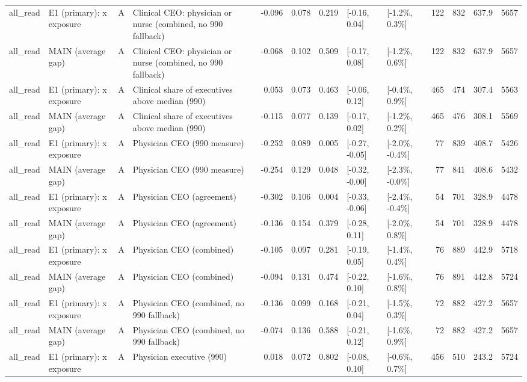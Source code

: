 \begin{tabular}{llllrrrllrrrr}
all\_read & E1 (primary): x exposure & A & Clinical CEO: physician or nurse (combined, no 990 fallback) & -0.096 & 0.078 & 0.219 & {}[-0.16, 0.04] & {}[-1.2\%, 0.3\%] & 122 & 832 & 637.9 & 5657\\
all\_read & MAIN (average gap) & A & Clinical CEO: physician or nurse (combined, no 990 fallback) & -0.068 & 0.102 & 0.509 & {}[-0.17, 0.08] & {}[-1.2\%, 0.6\%] & 122 & 832 & 637.9 & 5657\\
all\_read & E1 (primary): x exposure & A & Clinical share of executives above median (990) & 0.053 & 0.073 & 0.463 & {}[-0.06, 0.12] & {}[-0.4\%, 0.9\%] & 465 & 474 & 307.4 & 5563\\
all\_read & MAIN (average gap) & A & Clinical share of executives above median (990) & -0.115 & 0.077 & 0.139 & {}[-0.17, 0.02] & {}[-1.2\%, 0.2\%] & 465 & 476 & 308.1 & 5569\\
\addlinespace
all\_read & E1 (primary): x exposure & A & Physician CEO (990 measure) & -0.252 & 0.089 & 0.005 & {}[-0.27, -0.05] & {}[-2.0\%, -0.4\%] & 77 & 839 & 408.7 & 5426\\
all\_read & MAIN (average gap) & A & Physician CEO (990 measure) & -0.254 & 0.129 & 0.048 & {}[-0.32, -0.00] & {}[-2.3\%, -0.0\%] & 77 & 841 & 408.6 & 5432\\
all\_read & E1 (primary): x exposure & A & Physician CEO (agreement) & -0.302 & 0.106 & 0.004 & {}[-0.33, -0.06] & {}[-2.4\%, -0.4\%] & 54 & 701 & 328.9 & 4478\\
all\_read & MAIN (average gap) & A & Physician CEO (agreement) & -0.136 & 0.154 & 0.379 & {}[-0.28, 0.11] & {}[-2.0\%, 0.8\%] & 54 & 701 & 328.9 & 4478\\
all\_read & E1 (primary): x exposure & A & Physician CEO (combined) & -0.105 & 0.097 & 0.281 & {}[-0.19, 0.05] & {}[-1.4\%, 0.4\%] & 76 & 889 & 442.9 & 5718\\
\addlinespace
all\_read & MAIN (average gap) & A & Physician CEO (combined) & -0.094 & 0.131 & 0.474 & {}[-0.22, 0.10] & {}[-1.6\%, 0.8\%] & 76 & 891 & 442.8 & 5724\\
all\_read & E1 (primary): x exposure & A & Physician CEO (combined, no 990 fallback) & -0.136 & 0.099 & 0.168 & {}[-0.21, 0.04] & {}[-1.5\%, 0.3\%] & 72 & 882 & 427.2 & 5657\\
all\_read & MAIN (average gap) & A & Physician CEO (combined, no 990 fallback) & -0.074 & 0.136 & 0.588 & {}[-0.21, 0.12] & {}[-1.6\%, 0.9\%] & 72 & 882 & 427.2 & 5657\\
all\_read & E1 (primary): x exposure & A & Physician executive (990) & 0.018 & 0.072 & 0.802 & {}[-0.08, 0.10] & {}[-0.6\%, 0.7\%] & 456 & 510 & 243.2 & 5724\\

\end{tabular}

